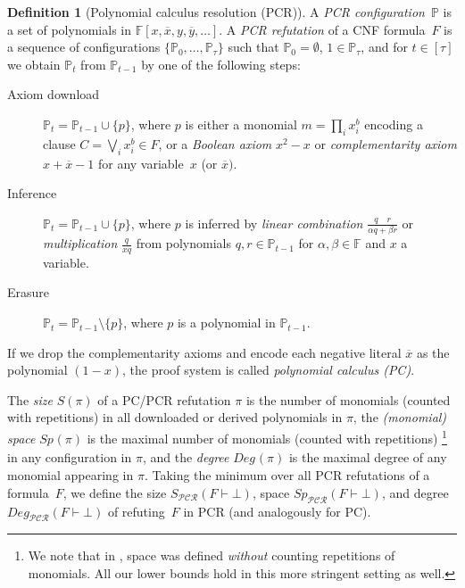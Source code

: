 \documentclass[11pt]{article}
\numberwithin{equation}{section}
\theoremstyle{definition}
\newtheorem{definition}[theorem]{Definition}
\theoremstyle{plain}
\theoremstyle{plain}
\theoremstyle{definition}
\newcommand{\fieldstd}{\mathbb{F}}
\newcommand{\set}[1]{\{ #1 \}}
\newcommand{\union}{\cup}
\newcommand{\olnot}[1]{\overline{#1}}
\newcommand{\introduceterm}[1]{{\emph{#1}}}
\newcommand{\proofsystemsubindexformat}[1]{\scriptscriptstyle{\mathcal{#1}}}
\newcommand{\pcrnot}{\proofsystemsubindexformat{PCR}}
\newcommand{\proofstd}{\pi}
\newcommand{\clausesetformat}[1]{\ensuremath{\mathbb{#1}}}
\newcommand{\derivabbrevsmall}[2]{( #1 \vdash #2 )}
\newcommand{\refutabbrevsmall}[1]{\derivabbrevsmall{#1}{\!\bot}}
\newcommand{\genericformsmall}[2]{\mathit{#1}( #2 )}
\newcommand{\genericrefsmall}[3]{{\mathit{#1}}_{#2}\refutabbrevsmall{#3}}
\newcommand{\sizeofarg}[1]{\genericformsmall{S}{#1}}
\newcommand{\sizeref}[2][]{\genericrefsmall{S}{#1}{#2}}
\newcommand{\mspaceof}[2][]{\genericformsmall{Sp_{#1}}{#2}}
\newcommand{\mspaceref}[2][]{\genericrefsmall{Sp}{#1}{#2}}
\newcommand{\mdegreeof}[2][]{\genericformsmall{Deg_{#1}}{#2}}
\newcommand{\mdegreeref}[2][]{\genericrefsmall{Deg}{#1}{#2}}
\newcommand{\pcconf}{\clausesetformat{P}}
\newcommand{\numset}[1]{[#1]}
\newcommand{\stoptime}{\tau}
\begin{document}
\begin{definition}[Polynomial calculus resolution (PCR)]
  \label{def:sequential-refutation}
  A \introduceterm{PCR con\-fig\-u\-ra\-tion}~$\pcconf$ is a set of
%
  polynomials 
  in
%
  $\fieldstd[x, \olnot{x}, y, \olnot{y}, \ldots]$.
  A 
  \introduceterm{PCR refutation} of a CNF formula~$F$
  is a
  sequence of configurations $\set{\pcconf_0, \ldots,
    \pcconf_\stoptime}$ such that $\pcconf_0 = \emptyset$, $1 \in
  \pcconf_{\stoptime}$, and
  for $t \in \numset{\stoptime}$
  we obtain
  $\pcconf_t$
  from $\pcconf_{t-1}$ by one of the following steps:
  \begin{description}
  \item[Axiom download] $\pcconf_t = \pcconf_{t-1} \union \set{p}$,
    where $p$ is either 
    a %
    monomial 
    $m = \prod_i x_i^b$
    encoding 
    a %
    clause
    $C=\bigvee_i x_i^b \in F$,
    or
    a \introduceterm{Boolean axiom} $x^2 - x$ 
    or
    \introduceterm{complementarity axiom} $x + \olnot{x} - 1$
    for any variable~$x$ (or $\olnot{x})$.
  \item[Inference] $\pcconf_t = \pcconf_{t - 1} \union \set{p}$, where
    $p$ is 
%
%
%
%
%
%
%
%
%
    inferred by 
    \introduceterm{linear combination} $\frac{q \quad r}{\alpha q + \beta r}$
    or
    \introduceterm{multiplication} $\frac{q}{x q}$
    from  polynomials $q, r \in \pcconf_{t - 1}$ 
    for $\alpha, \beta \in \fieldstd$ and $x$ a variable.
  \item[Erasure] $\pcconf_t = \pcconf_{t - 1} \setminus \set{p}$,
    where $p$ is a polynomial in $\pcconf_{t - 1}$.
  \end{description}
  If we drop
  the  %
  complementarity axioms and encode each negative literal
  $\olnot{x}$ as the polynomial $(1 - x)$, the proof system is called
  \introduceterm{polynomial calculus (PC)}. 

  The \introduceterm{size} $\sizeofarg{\proofstd}$ of a
  PC/PCR refutation $\proofstd$ is the number of monomials (counted
  with repetitions) in all downloaded or derived polynomials in
  $\proofstd$, the \introduceterm{(monomial) space}
  $\mspaceof{\proofstd}$ is the maximal number of monomials (counted
  with repetitions)%
  \footnote{%
    We note that in
      \cite{ABRW02SpaceComplexity},
      space was defined \emph{without} counting repetitions of monomials. 
      All our lower bounds hold in this more stringent setting as well.}
  in any configuration in $\proofstd$, and the
  \introduceterm{degree} $\mdegreeof{\proofstd}$ is the maximal degree
  of any monomial appearing in $\proofstd$.  Taking the minimum over
  all PCR refutations of a formula~$F$, we define the size
  $\sizeref[\pcrnot]{F}$, space $\mspaceref[\pcrnot]{F}$, and degree
  $\mdegreeref[\pcrnot]{F}$ of refuting~$F$ in PCR
  (and analogously for PC).
\end{definition}
\end{document}
